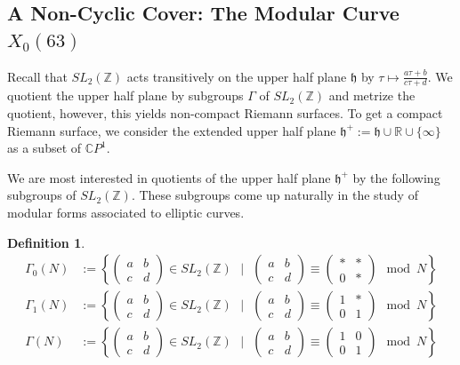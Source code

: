 \documentclass[12pt,reqno]{amsart}
\newcommand{\C}{\mathbb{C}}
\newcommand{\Z}{\mathbb{Z}}
\newcommand{\R}{\mathbb{R}}
\theoremstyle{definition}
\newtheorem{defn}{Definition}
\theoremstyle{remark}
\begin{document}
\subsection{A Non-Cyclic Cover: The Modular Curve $X_0(63)$}


\label{sec:modular}
Recall that $SL_2(\Z)$ acts transitively on the upper half plane $\mathfrak{h}$ by $\tau \mapsto \frac{a\tau + b}{c\tau + d}$. We quotient the upper half plane by subgroups $\Gamma$ of $SL_2(\Z)$ and metrize the quotient, however, this yields non-compact Riemann surfaces. To get a compact Riemann surface, we consider the extended upper half plane $\mathfrak{h}^{+} := \mathfrak{h} \cup \R \cup \{ \infty \}$ as a subset of $\C P^1$.  

We are most interested in quotients of the upper half plane $\mathfrak{h}^{+}$ by the following subgroups of $SL_2(\Z)$. These subgroups come up naturally in the study of modular forms associated to elliptic curves.

\begin{defn} 
\begin{align*} 
\Gamma_0(N) &:= \left\{ \begin{pmatrix} a & b \\ c & d \end{pmatrix} \in SL_2(\Z) \text{ }  \Big| \text{ } \begin{pmatrix} a & b \\ c & d \end{pmatrix} \equiv  \begin{pmatrix} * & * \\ 0 & * \end{pmatrix} \mod N \right\} \\
\Gamma_1(N) &:= \left\{ \begin{pmatrix} a & b \\ c & d \end{pmatrix} \in SL_2(\Z) \text{ }  \Big| \text{ }  \begin{pmatrix} a & b \\ c & d \end{pmatrix} \equiv  \begin{pmatrix} 1 & * \\ 0 & 1 \end{pmatrix} \mod N \right\} \\
\Gamma(N) &:= \left\{ \begin{pmatrix} a & b \\ c & d \end{pmatrix} \in SL_2(\Z) \text{ }  \Big| \text{ }  \begin{pmatrix} a & b \\ c & d \end{pmatrix} \equiv  \begin{pmatrix} 1 & 0 \\ 0 & 1 \end{pmatrix} \mod N \right\}
\end{align*}
 \end{defn} 
\end{document}
